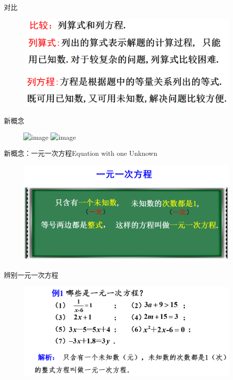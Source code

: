 \begin{frame}{对比}
    \begin{figure}
        \includegraphics[width=.9\textwidth]{assets/comparison.png}
    \end{figure}
\end{frame}

\begin{frame}{新概念}
    \begin{figure}
        \includegraphics<1>[width=.9\textwidth]{assets/new.png}
        \includegraphics<2>[width=.9\textwidth]{assets/new2.png}
    \end{figure}
\end{frame}

\begin{frame}{新概念：一元一次方程}{Equation with one Unknown}
    \begin{figure}
        \includegraphics[width=.9\textwidth]{assets/new3.png}
    \end{figure}
\end{frame}

\begin{frame}{辨别一元一次方程}
    \begin{figure}
        \includegraphics[width=.9\textwidth]{assets/new4.png}
    \end{figure}
\end{frame}

